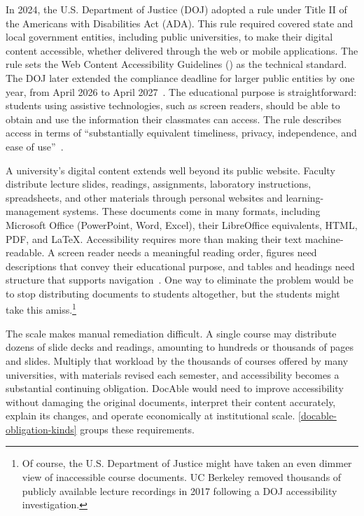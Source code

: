 In 2024, the U.S. Department of Justice (DOJ) adopted a rule under Title II of the Americans with Disabilities Act (ADA). This rule required covered state and local government entities, including public universities, to make their digital content accessible, whether delivered through the web or mobile applications. The rule sets the Web Content Accessibility Guidelines () as the technical standard. The DOJ later extended the compliance deadline for larger public entities by one year, from April 2026 to April 2027~\citep{doj2026extension}. The educational purpose is straightforward: students using assistive technologies, such as screen readers, should be able to obtain and use the information their classmates can access. The rule describes access in terms of ``substantially equivalent timeliness, privacy, independence, and ease of use''~\citep{doj-web-accessibility-2024}.

A university's digital content extends well beyond its public website. Faculty distribute lecture slides, readings, assignments, laboratory instructions, spreadsheets, and other materials through personal websites and learning-management systems. These documents come in many formats, including Microsoft Office (PowerPoint, Word, Excel), their LibreOffice equivalents, HTML, PDF, and LaTeX. Accessibility requires more than making their text machine-readable. A screen reader needs a meaningful reading order, figures need descriptions that convey their educational purpose, and tables and headings need structure that supports navigation~\citep{w3c2018wcag21}.
One way to eliminate the problem would be to stop distributing documents to students altogether, but the students might take this amiss.\footnote{Of course, the U.S. Department of Justice might have taken an even dimmer view of inaccessible course documents. UC Berkeley removed thousands of publicly available lecture recordings in 2017 following a DOJ accessibility investigation.}

The scale makes manual remediation difficult. A single course may distribute dozens of slide decks and readings, amounting to hundreds or thousands of pages and slides. Multiply that workload by the thousands of courses offered by many universities, with materials revised each semester, and accessibility becomes a substantial continuing obligation. DocAble would need to improve accessibility without damaging the original documents, interpret their content accurately, explain its changes, and operate economically at institutional scale. \autoref{docable-obligation-kinds} groups these requirements.

